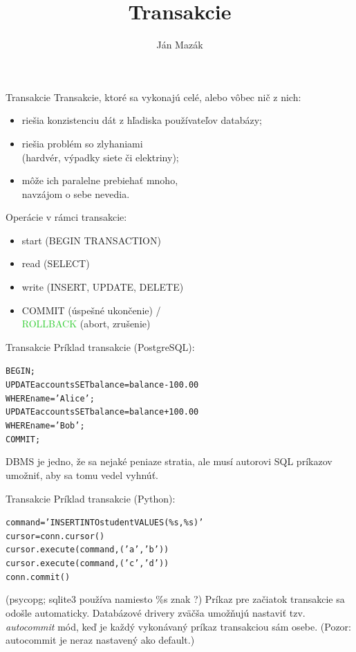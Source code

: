 \documentclass[12pt]{beamer}
\title{Transakcie}
\author{Ján Mazák}
\institute{FMFI UK Bratislava}
\date{}
\def\blue#1{\textcolor{Cerulean}{#1}}
\def\green#1{\textcolor{LimeGreen}{#1}}
\begin{document}
\frame{\titlepage}


\begin{frame}[fragile]{Transakcie}
\alert{Transakcie}, ktoré sa vykonajú celé, alebo vôbec nič z nich:
\begin{itemize}
\item riešia konzistenciu dát z hľadiska používateľov databázy;
\item riešia problém so zlyhaniami\\ (hardvér, výpadky siete či elektriny);
\item môže ich paralelne prebiehať mnoho,\\ navzájom o sebe nevedia.
\end{itemize}

\bigskip
Operácie v rámci transakcie:
\begin{itemize}
\item start (BEGIN TRANSACTION)
\item read (SELECT)
\item write (INSERT, UPDATE, DELETE)
\item \blue{COMMIT} (úspešné ukončenie) /\\\green{ROLLBACK} (abort, zrušenie)
\end{itemize}
\end{frame}


\begin{frame}[fragile]{Transakcie}
Príklad transakcie (PostgreSQL):
\begin{alltt}
    BEGIN;
    UPDATE accounts SET balance = balance - 100.00
        WHERE name = 'Alice';
    UPDATE accounts SET balance = balance + 100.00
        WHERE name = 'Bob';
    COMMIT;
\end{alltt}
DBMS je jedno, že sa nejaké peniaze stratia, ale musí autorovi SQL príkazov umožniť, aby sa tomu vedel vyhnúť.
\end{frame}


\begin{frame}[fragile]{Transakcie}
Príklad transakcie (Python):
\begin{alltt}
    command = 'INSERT INTO student VALUES (\%s, \%s)'
    cursor = conn.cursor()
    cursor.execute(command, ('a', 'b'))
    cursor.execute(command, ('c', 'd'))
    conn.commit()
\end{alltt}
(psycopg; sqlite3 používa namiesto \%s znak ?)
Príkaz pre začiatok transakcie sa odošle automaticky.
Databázové drivery zväčša umožňujú nastaviť tzv. \emph{autocommit} mód,
keď je každý vykonávaný príkaz transakciou sám osebe.
(Pozor: autocommit je neraz nastavený ako default.)
\end{frame}
\end{document}
